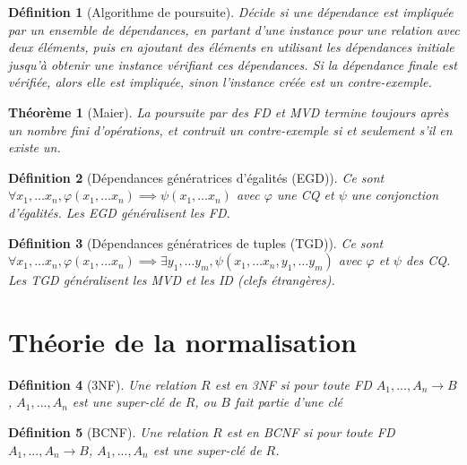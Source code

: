 \documentclass[landscape]{article}
\newcommand{\1}{\mathbbm{1}}
\newcommand{\0}{\mathbbm{0}}
\renewcommand{\phi}{\varphi}
\newtheorem{theo}{Théorème}
\newtheorem{defi}{Définition}
\begin{document}
\begin{multicols}{2}
    \begin{defi}[Algorithme de poursuite]
        Décide si une dépendance est impliquée par un ensemble de dépendances, en
        partant d'une instance pour une relation avec deux éléments, puis en ajoutant
        des éléments en utilisant les dépendances initiale jusqu'à obtenir une instance
        vérifiant ces dépendances. Si la dépendance finale est vérifiée, alors
        elle est impliquée, sinon l'instance créée est un contre-exemple.
    \end{defi}

    \begin{theo}[Maier]
        La poursuite par des FD et MVD termine toujours après un nombre fini
        d'opérations, et contruit un contre-exemple si et seulement s'il en
        existe un.
    \end{theo}

    \begin{defi}[Dépendances génératrices d'égalités (EGD)] Ce sont
        $\forall x_1,\ldots x_n, \phi(x_1,\ldots x_n)\implies \psi(x_1,\ldots x_n)$
        avec $\phi$ une CQ et $\psi$ une conjonction d'égalités. Les EGD généralisent
        les FD.
    \end{defi}

    \begin{defi}[Dépendances génératrices de tuples (TGD)] Ce sont
        $\forall x_1,\ldots x_n, \phi(x_1,\ldots x_n)\implies\exists y_1,\ldots y_m, \psi(x_1,\ldots x_n, y_1, \ldots y_m)$
        avec $\phi$ et $\psi$ des CQ. Les TGD généralisent les MVD et les ID
        (clefs étrangères).
    \end{defi}


    \section{Théorie de la normalisation}
    
    \begin{defi}[3NF]
      Une relation $R$ est en 3NF si pour toute FD $A_1,...,A_n \rightarrow B$,
      $A_1,...,A_n$ est une super-clé de $R$, ou $B$ fait partie d'une clé
    \end{defi}

    \begin{defi}[BCNF]
      Une relation $R$ est en BCNF si pour toute FD $A_1,...,A_n \rightarrow B$,
      $A_1,...,A_n$ est une super-clé de $R$.
    \end{defi}


\end{multicols}
\end{document}
